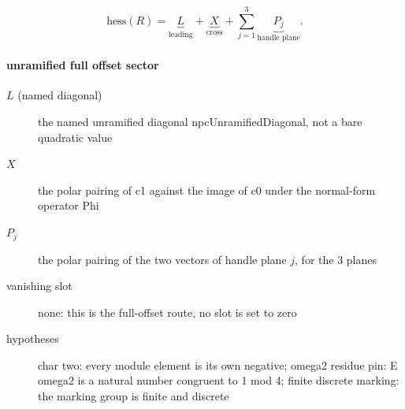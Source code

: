 \[\mathrm{hess}(R)=\underbrace{L}_{\text{leading}}+\underbrace{X}_{\text{cross}}+\sum_{j=1}^{3}\underbrace{P_j}_{\text{handle plane}}.\]
\paragraph{unramified full offset sector}
\begin{description}
\item[$L$ (named diagonal)] the named unramified diagonal npcUnramifiedDiagonal, not a bare quadratic value
\item[$X$] the polar pairing of c1 against the image of c0 under the normal-form operator Phi
\item[$P_j$] the polar pairing of the two vectors of handle plane $j$, for the 3 planes
\item[vanishing slot] none: this is the full-offset route, no slot is set to zero
\item[hypotheses] char two: every module element is its own negative; omega2 residue pin: E omega2 is a natural number congruent to 1 mod 4; finite discrete marking: the marking group is finite and discrete
\end{description}
